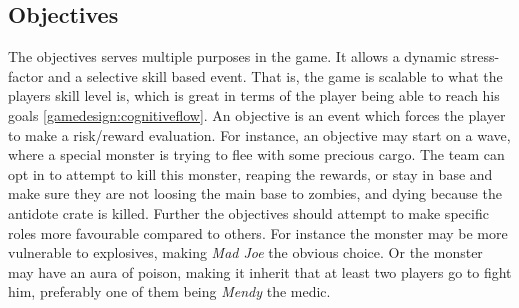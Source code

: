\subsection*{Objectives}\label{gamedesign:ourgame:objectives}
The objectives serves multiple purposes in the game. It allows a dynamic stress-factor and a selective skill based event. That is, the game is scalable to what the players skill level is, which is great in terms of the player being able to reach his goals \ref{gamedesign:cognitiveflow}. An objective is an event which forces the player to make a risk/reward evaluation. For instance, an objective may start on a wave, where a special monster is trying to flee with some precious cargo. The team can opt in to attempt to kill this monster, reaping the rewards, or stay in base and make sure they are not loosing the main base to zombies, and dying because the antidote crate is killed. Further the objectives should attempt to make specific roles more favourable compared to others. For instance the monster may be more vulnerable to explosives, making \emph{Mad Joe} the obvious choice. Or the monster may have an aura of poison, making it inherit that at least two players go to fight him, preferably one of them being \emph{Mendy} the medic. 

